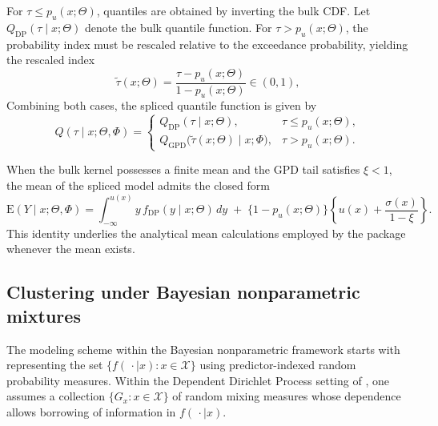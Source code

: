 \documentclass[preprint,12pt,authoryear]{elsarticle}
\begin{document}
For $\tau \le p_u(x;\Theta)$, quantiles are obtained by inverting the
bulk CDF.  Let $Q_{\mathrm{DP}}(\tau\mid x;\Theta)$ denote the bulk
quantile function.  For $\tau > p_u(x;\Theta)$, the probability index
must be rescaled relative to the exceedance probability, yielding the
rescaled index
\begin{equation*}
\tilde{\tau}(x;\Theta)=\dfrac{\tau-p_u(x;\Theta)}{1-p_u(x;\Theta)}\in(0,1),
\end{equation*}
Combining both cases, the spliced quantile function is given by
\begin{equation}
Q(\tau\mid x;\Theta,\Phi)=
\begin{cases}
Q_{\mathrm{DP}}(\tau\mid x;\Theta), & \tau \le p_u(x;\Theta),\\[8pt]
Q_{\mathrm{GPD}}\!\bigl(\tilde{\tau}(x;\Theta)\mid x;\Phi\bigr), & \tau>p_u(x;\Theta).
\end{cases}
\label{eq:splice_quantile_case}
\end{equation}

When the bulk kernel possesses a finite mean and the GPD tail satisfies
$\xi<1$, the mean of the spliced model admits the closed form
\[
\mathrm{E}(Y\mid x;\Theta,\Phi)=
\int_{-\infty}^{u(x)} y\,f_{\mathrm{DP}}(y\mid x;\Theta)\,dy
\;+\;
\bigl\{1-p_u(x;\Theta)\bigr\}
\left\{u(x)+\frac{\sigma(x)}{1-\xi}\right\}.
\]
This identity underlies the analytical mean calculations employed by
the package whenever the mean exists.


\subsection{Clustering under Bayesian nonparametric mixtures}
\label{subsec:clustering-theory}

The modeling scheme within the Bayesian nonparametric framework starts with representing the set $\{f(\,\cdot\mid x): x\in\mathcal{X}\}$ using predictor-indexed random probability measures. Within the Dependent Dirichlet Process setting of \citet{MacEachern1999,MacEachern2000}, one assumes a collection $\{G_x: x\in\mathcal{X}\}$ of random mixing measures whose dependence allows borrowing of information in $f(\,\cdot\mid x)$.
\end{document}
